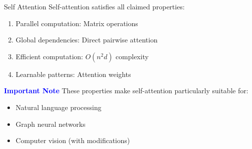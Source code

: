 \documentclass[serif, aspectratio=169]{beamer}
\begin{document}
\begin{frame}{Self Attention}
        Self-attention satisfies all claimed properties:
        \begin{enumerate}
            \item Parallel computation: Matrix operations
            \item Global dependencies: Direct pairwise attention
            \item Efficient computation: $O(n^2d)$ complexity
            \item Learnable patterns: Attention weights
        \end{enumerate}
    \textcolor{blue}{\textbf{Important Note}}
    \newline
        These properties make self-attention particularly suitable for:
        \begin{itemize}
            \item Natural language processing
            \item Graph neural networks
            \item Computer vision (with modifications)
        \end{itemize}
\end{frame}
\end{document}
